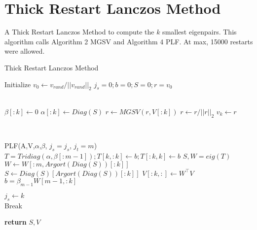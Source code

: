 \documentclass[a4paper]{article}
\begin{document}
\pagebreak

\section{Thick Restart Lanczos Method}
A Thick Restart Lanczos Method to compute the $k$ smallest eigenpairs. This algorithm calls Algorithm 2 MGSV and Algorithm 4 PLF. At max, 15000 restarts were allowed.


\begin{algorithm}
\caption{Thick Restart Lanczos Method}\label{alg:TRLM}
\begin{algorithmic}[1]
\State Initialize $v_0 \gets v_{rand}/||v_{rand}||_2 $
\State $j_s = 0; b = 0; S = 0; r = v_0$

        \\
        \State $\beta[:k] \gets 0$
        \State $\alpha[:k] \gets Diag(S)$
        \State $r \gets MGSV(r,V[:k])$
        \State $r \gets r / ||r||_2$
        \State $v_k \gets r$

        \\
        
        \State PLF(A,V,$\alpha$,$\beta$, $j_s = j_s$, $j_t = m$) 
        \\
        \State $T = Tridiag(\alpha,\beta[:m-1]); T[k,:k] \gets b; T[:k,k] \gets b$
        \State $S,W = eig(T)$
        \State $W \gets W[:m,Argort(Diag(S))[:k]]$
        \State $S \gets Diag(S)[Argort(Diag(S))[:k]]$
        \State $V[:k,:] \gets W^\top V$
        \State $b = \beta_{m-1} W[m-1, :k]$ 
        
        \State $j_s \gets k$ 
        \\
            \State Break
        \EndIf
        
        
\EndFor



\State \textbf{return} $S, V$

\EndProcedure
\end{algorithmic}
\end{algorithm}
\end{document}
